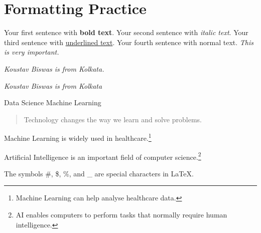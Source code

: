\documentclass{article}
\begin{document}
	\section{Formatting Practice}
	
	Your first sentence with \textbf{bold text}.
	Your second sentence with \textit{italic text}.
	Your third sentence with \underline{underlined text}.
	Your fourth sentence with normal text.
	\textit{This is \emph{very important}.}
	
	\emph{Koustav Biswas \textit{is from Kolkata}.}
	
	\textit{Koustav Biswas is from \emph{Kolkata}}
	
	{\small Data}
	{\large Science}
	{\Large Machine}
	{\huge Learning}
	
	\begin{quote}
		\centering
		Technology changes the way we learn and solve problems.
	\end{quote}
	
	
	Machine Learning is widely used in healthcare.\footnote{Machine Learning can help analyse healthcare data.}
	
	Artificial Intelligence is an important field of computer science.\footnote{AI enables computers to perform tasks that normally require human intelligence.}
	
	The symbols \#, \$, \%, and \_ are special characters in LaTeX.
\end{document}
